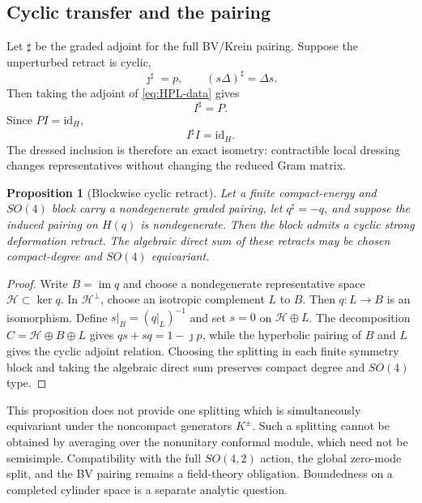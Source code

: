 \documentclass[11pt]{article}
\newtheorem{proposition}[theorem]{Proposition}
\theoremstyle{definition}
\theoremstyle{remark}
\newcommand{\cH}{\mathcal H}
\newcommand{\id}{\mathrm{id}}
\newcommand{\im}{\operatorname{im}}
\begin{document}
\subsection{Cyclic transfer and the pairing}

Let $\sharp$ be the graded adjoint for the full BV/Krein pairing.  Suppose
the unperturbed retract is cyclic,
\begin{equation}\label{eq:cyclic-SDR}
 \jmath^\sharp=p,
 \qquad (s\Delta)^\sharp=\Delta s.
\end{equation}
Then taking the adjoint of \eqref{eq:HPL-data} gives
\begin{equation}
 I^\sharp=P.
\end{equation}
Since $PI=\id_H$,
\begin{equation}\label{eq:HPL-isometry}
 \boxed{I^\sharp I=\id_H.}
\end{equation}
The dressed inclusion is therefore an exact isometry: contractible local
dressing changes representatives without changing the reduced Gram matrix.

\begin{proposition}[Blockwise cyclic retract]\label{prop:cyclic-retract}
Let a finite compact-energy and $SO(4)$ block carry a nondegenerate graded
pairing, let $q^\sharp=-q$, and suppose the induced pairing on $H(q)$ is
nondegenerate.  Then the block admits a cyclic strong deformation retract.
The algebraic direct sum of these retracts may be chosen compact-degree and
$SO(4)$ equivariant.
\end{proposition}

\begin{proof}
Write $B=\im q$ and choose a nondegenerate representative space
$\cH\subset\ker q$.  In $\cH^\perp$, choose an isotropic complement $L$ to
$B$.  Then $q:L\to B$ is an isomorphism.  Define $s|_B=(q|_L)^{-1}$ and set
$s=0$ on $\cH\oplus L$.  The decomposition
$C=\cH\oplus B\oplus L$ gives $qs+sq=1-\jmath p$, while the hyperbolic
pairing of $B$ and $L$ gives the cyclic adjoint relation.  Choosing the
splitting in each finite symmetry block and taking the algebraic direct sum
preserves compact degree and $SO(4)$ type.
\end{proof}

This proposition does not provide one splitting which is simultaneously
equivariant under the noncompact generators $K^\pm$.  Such a splitting
cannot be obtained by averaging over the nonunitary conformal module, which
need not be semisimple.  Compatibility with the full $SO(4,2)$ action, the
global zero-mode split, and the BV pairing remains a field-theory
obligation.  Boundedness on a completed cylinder space is a separate
analytic question.
\end{document}
